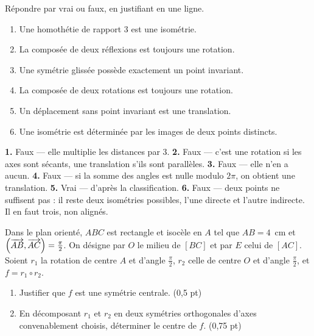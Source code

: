 \begin{jemeteste}
Répondre par vrai ou faux, en justifiant en une ligne.

\begin{enumerate}[label=\textbf{\arabic*.}, leftmargin=*, itemsep=0.28em]
  \item Une homothétie de rapport $3$ est une isométrie.
  \item La composée de deux réflexions est toujours une rotation.
  \item Une symétrie glissée possède exactement un point invariant.
  \item La composée de deux rotations est toujours une rotation.
  \item Un déplacement sans point invariant est une translation.
  \item Une isométrie est déterminée par les images de deux points distincts.
\end{enumerate}
\end{jemeteste}

\begin{corrige}[je me teste]
\textbf{1.} Faux — elle multiplie les distances par $3$.
\textbf{2.} Faux — c'est une rotation si les axes sont sécants, une
translation s'ils sont parallèles.
\textbf{3.} Faux — elle n'en a aucun.
\textbf{4.} Faux — si la somme des angles est nulle modulo $2\pi$, on obtient
une translation.
\textbf{5.} Vrai — d'après la classification.
\textbf{6.} Faux — deux points ne suffisent pas : il reste deux isométries
possibles, l'une directe et l'autre indirecte. Il en faut trois, non alignés.
\end{corrige}

\begin{commeaubac}
Dans le plan orienté, $ABC$ est rectangle et isocèle en $A$ tel que
$AB = 4$~cm et $\left(\overrightarrow{AB},\overrightarrow{AC}\right) = \frac{\pi}{2}$. On désigne
par $O$ le milieu de $[BC]$ et par $E$ celui de $[AC]$. Soient $r_{1}$ la
rotation de centre $A$ et d'angle $\frac{\pi}{2}$, $r_{2}$ celle de centre $O$
et d'angle $\frac{\pi}{2}$, et $f = r_{1} \circ r_{2}$.

\begin{enumerate}[label=\textbf{\arabic*.}, leftmargin=*, itemsep=0.25em]
  \item Justifier que $f$ est une symétrie centrale. \hfill\textup{(0,5 pt)}
  \item En décomposant $r_{1}$ et $r_{2}$ en deux symétries orthogonales
        d'axes convenablement choisis, déterminer le centre de $f$.
        \hfill\textup{(0,75 pt)}
\end{enumerate}
\end{commeaubac}

